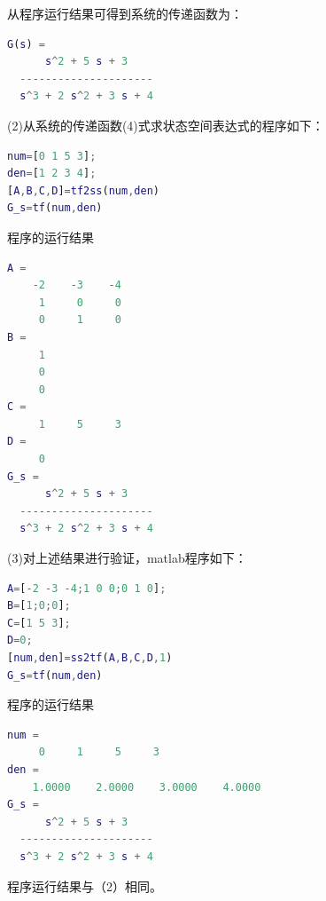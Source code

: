 \documentclass[UTF8]{ctexart}
\begin{document}
\par 从程序运行结果可得到系统的传递函数为：
\par  \begin{lstlisting}[language=matlab,escapeinside=``]
G(s) =
      s^2 + 5 s + 3
  ---------------------
  s^3 + 2 s^2 + 3 s + 4
\end{lstlisting}

\par (2)从系统的传递函数(4)式求状态空间表达式的程序如下：
\par  \begin{lstlisting}[language=matlab,escapeinside=``]
num=[0 1 5 3];
den=[1 2 3 4];
[A,B,C,D]=tf2ss(num,den)
G_s=tf(num,den)
\end{lstlisting}

\par 程序的运行结果
\par  \begin{lstlisting}[language=matlab,escapeinside=``]
A =
    -2    -3    -4
     1     0     0
     0     1     0
B =
     1
     0
     0
C =
     1     5     3
D =
     0   
G_s =
      s^2 + 5 s + 3
  ---------------------
  s^3 + 2 s^2 + 3 s + 4
\end{lstlisting}
\par (3)对上述结果进行验证，matlab程序如下：
\par  \begin{lstlisting}[language=matlab,escapeinside=``]
A=[-2 -3 -4;1 0 0;0 1 0];
B=[1;0;0];
C=[1 5 3];
D=0;
[num,den]=ss2tf(A,B,C,D,1)
G_s=tf(num,den)
\end{lstlisting}
\par 程序的运行结果
\par  \begin{lstlisting}[language=matlab,escapeinside=``]
num =
     0     1     5     3
den =
    1.0000    2.0000    3.0000    4.0000
G_s =
      s^2 + 5 s + 3
  ---------------------
  s^3 + 2 s^2 + 3 s + 4
\end{lstlisting}
\par 程序运行结果与（2）相同。
\end{document}
